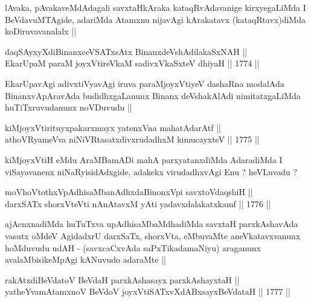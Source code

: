 \begin{artha}
lAvaka, pAvakaveMdAdagali savxtaHkAraka kataqRvAdavanige kirxyegaLiMda
I BeVdavuMTAgide, adariMda Atamxnu nijavAgi kArakatavx
(kataqRtavx)diMda koDiruvavanalalx ||
\end{artha}


\begin{shl}
daqSAyxyXdiBinanxceVSATxsAtx BinanxdeVshAdilakaSxNAH || \\
EkarUpaM paraM joyxVtireVkaM sadivxVkaSxteV dhiyaH ||  1774 ||  
\end{shl}

\begin{artha}
EkarUpavAgi adivxtiVyavAgi iruva paraMjoyxVtiyeV dashaRna modalAda
BinanxvApAravAda budidhxgaLanunx Binanx deVshakAlAdi nimitatxgaLiMda
huTiTxruvudanunx noVDuvudu ||
\end{artha}

\begin{shl}
kiMjoyxVtirituyxpakarxmayx yatenxVna mahatA\s \s darAtf ||  \\
athoVR\s yameVva niNiVRtasatxdivxrudadhxM kimucayxteV ||  1775 ||  
\end{shl}

\begin{artha}
kiMjoyxVtiH eMdu AraMBamADi mahA parxyatanxdiMda AdaradiMda I
viSayavanenx niNaRyisidAdxgide, adakekx virudadhxvAgi Enu ? heVLuvadu ?
\end{artha}


\begin{shl}
moVhoVtothxVpAdhisaMbanAdhxdaBinonxV\s pi savxtoVdaqshiH || \\
darxSATx shorxVteVti nAnAtavxM yAti yadavxdalakatxkamf ||  1776 ||  
\end{shl}

\begin{artha}
ajAcnxnadiMda huTuTxva upAdhisaMbaMdhadiMda savxtaH parxkAshavAda
vasutx oMdeV AgidadxrU darxSaTx, shorxVta, eMbuvaMte aneVkatavxvanunx
hoMduvudu udAH - (savxcaCxvAda saPxTikadamaNiyu) araganunx
avalaMbisikeMpAgi kANuvudo adaraMte ||
\end{artha}

\begin{shl}
rakAtxdiBeVdatoV BeVdaH parxkAshasayx parxkAshayxtaH || \\
yatheYvamAtamxnoV BeVdoV joyxVtiSATxvXdABxsayxBeVdataH ||  1777 ||  
\end{shl}

